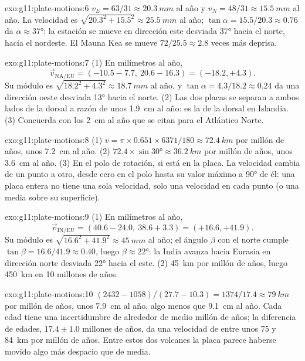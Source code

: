 \begin{solution}{exo:g11:plate-motions:6}
$v_E = 63/31 \approx \qty{20.3}{mm}$ al año y $v_N = 48/31 \approx
\qty{15.5}{mm}$ al año. La velocidad es $\sqrt{20.3^2 + 15.5^2} \approx
\qty{25.5}{mm}$ al año; $\tan\alpha = 15.5/20.3 \approx 0.76$ da $\alpha
\approx \ang{37}$: la estación se mueve en dirección este desviada \ang{37}
hacia el norte, hacia el nordeste. El Mauna Kea se mueve $72/25.5 \approx 2.8$
veces más deprisa.
\end{solution}

\begin{solution}{exo:g11:plate-motions:7}
(1) En milímetros al año,
\[
  \vec v_{\mathrm{NA/EU}} = (-10.5 - 7.7,\ 20.6 - 16.3) = (-18.2, +4.3).
\] Su módulo es $\sqrt{18.2^2 + 4.3^2} \approx
\qty{18.7}{mm}$ al año, y $\tan\alpha = 4.3/18.2 \approx 0.24$ da una
dirección oeste desviada \ang{13} hacia el norte. (2) Las dos placas se
separan a ambos lados de la dorsal a razón de unos \qty{1.9}{cm} al año: es la
 de la dorsal en Islandia. (3) Concuerda con los
\qty{2}{cm} al año que se citan para el Atlántico Norte.
\end{solution}

\begin{solution}{exo:g11:plate-motions:8}
(1) $v = \pi \times 0.651 \times 6371/180 \approx \qty{72.4}{km}$ por millón
de años, unos \qty{7.2}{cm} al año. (2) $72.4 \times \sin\ang{30} \approx
\qty{36.2}{km}$ por millón de años, unos \qty{3.6}{cm} al año. (3) En el polo
de rotación, si está en la placa. La velocidad cambia de un punto a otro,
desde cero en el polo hasta su valor máximo a \ang{90} de él: una placa entera
no tiene una sola velocidad, solo una velocidad en cada punto (o una media
sobre su superficie).
\end{solution}

\begin{solution}{exo:g11:plate-motions:9}
(1) En milímetros al año,
\[
  \vec v_{\mathrm{IN/EU}} = (40.6 - 24.0,\ 38.6 + 3.3) = (+16.6, +41.9).
\] Su módulo es $\sqrt{16.6^2 + 41.9^2} \approx
\qty{45}{mm}$ al año; el ángulo $\beta$ con el norte cumple $\tan\beta =
16.6/41.9 \approx 0.40$, luego $\beta \approx \ang{22}$: la India avanza hacia
Eurasia en dirección norte desviada \ang{22} hacia el este. (2) \qty{45}{km}
por millón de años, luego \qty{450}{km} en 10 millones de años.
\end{solution}

\begin{solution}{exo:g11:plate-motions:10}
$(2432 - 1058)/(27.7 - 10.3) = 1374/17.4 \approx \qty{79}{km}$ por millón
de años, unos \qty{7.9}{cm} al año, algo menos que \qty{9.1}{cm} al año.
Cada edad tiene una incertidumbre de alrededor de medio millón de años; la
diferencia de edades, $17.4 \pm 1.0$ millones de años, da una velocidad de
entre unos 75 y \qty{84}{km} por millón de años. Entre estos dos volcanes la
placa parece haberse movido algo más despacio que de media.
\end{solution}

